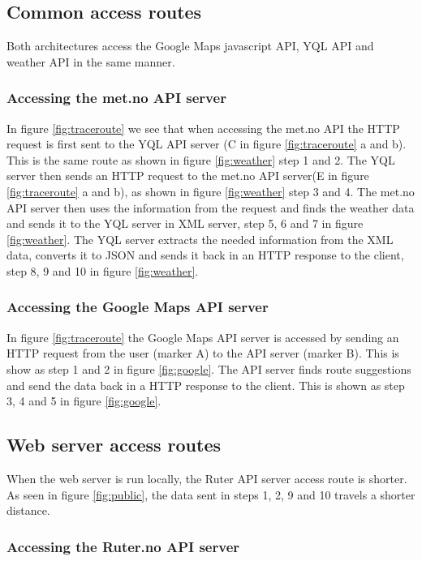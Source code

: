 \documentclass[10pt,a4paper]{article}
\begin{document}
\subsection{Common access routes}
Both architectures access the Google Maps javascript API, YQL API and weather API in the same manner. 

\subsubsection{Accessing the met.no API server}
In figure \ref{fig:traceroute} we see that when accessing the met.no API the HTTP request is first sent to the YQL API server (C in figure \ref{fig:traceroute} a and b). This is the same route as shown in figure \ref{fig:weather} step 1 and 2. The YQL server then sends an HTTP request to the met.no API server(E in figure \ref{fig:traceroute} a and b), as shown in figure \ref{fig:weather} step 3 and 4. The met.no API server then uses the information from the request and finds the weather data and sends it to the YQL server in XML server, step 5, 6 and 7 in figure \ref{fig:weather}. The YQL server extracts the needed information from the XML data, converts it to JSON and sends it back in an HTTP response to the client, step 8, 9 and 10 in figure \ref{fig:weather}.

\subsubsection{Accessing the Google Maps API server}
In figure \ref{fig:traceroute} the Google Maps API server is accessed by sending an HTTP request from the user (marker A) to the API server (marker B). This is show as step 1 and 2 in figure \ref{fig:google}. The API server finds route suggestions and send the data back in a HTTP response to the client. This is shown as step 3, 4 and 5 in figure \ref{fig:google}.

\subsection{Web server access routes}
\label{sec:web-server-access}
When the web server is run locally, the Ruter API server access route is shorter. As seen in figure \ref{fig:public}, the data sent in steps 1, 2, 9 and 10 travels a shorter distance. 
\subsubsection{Accessing the Ruter.no API server}
\end{document}
